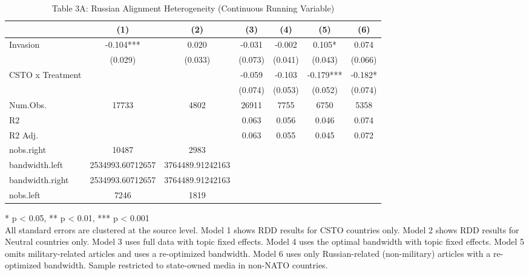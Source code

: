 \begin{table}[!t]
\caption{Table 3A: Russian Alignment Heterogeneity (Continuous Running Variable)} 
\fontsize{12.0pt}{14.4pt}\selectfont
\begin{tabular*}{\linewidth}{@{\extracolsep{\fill}}lcccccc}
\toprule
  & (1) & (2) & (3) & (4) & (5) & (6) \\ 
\midrule\addlinespace[2.5pt]
Invasion & -0.104*** & 0.020 & -0.031 & -0.002 & 0.105* & 0.074 \\ 
 & (0.029) & (0.033) & (0.073) & (0.041) & (0.043) & (0.066) \\ 
CSTO x Treatment &  &  & -0.059 & -0.103 & -0.179*** & -0.182* \\ 
{} & {} & {} & {(0.074)} & {(0.053)} & {(0.052)} & {(0.074)} \\ 
Num.Obs. & 17733 & 4802 & 26911 & 7755 & 6750 & 5358 \\ 
R2 &  &  & 0.063 & 0.056 & 0.046 & 0.074 \\ 
R2 Adj. &  &  & 0.063 & 0.055 & 0.045 & 0.072 \\ 
nobs.right & 10487 & 2983 &  &  &  &  \\ 
bandwidth.left & 2534993.60712657 & 3764489.91242163 &  &  &  &  \\ 
bandwidth.right & 2534993.60712657 & 3764489.91242163 &  &  &  &  \\ 
nobs.left & 7246 & 1819 &  &  &  &  \\ 
\bottomrule
\end{tabular*}
\begin{minipage}{\linewidth}
* p < 0.05, ** p < 0.01, *** p < 0.001\\
All standard errors are clustered at the source level. Model 1 shows RDD results
for CSTO countries only. Model 2 shows RDD results for Neutral countries only.
Model 3 uses full data with topic fixed effects. Model 4 uses the optimal
bandwidth with topic fixed effects. Model 5 omits military-related articles and
uses a re-optimized bandwidth. Model 6 uses only Russian-related (non-military)
articles with a re-optimized bandwidth. Sample restricted to state-owned media
in non-NATO countries.\\
\end{minipage}
\end{table}

